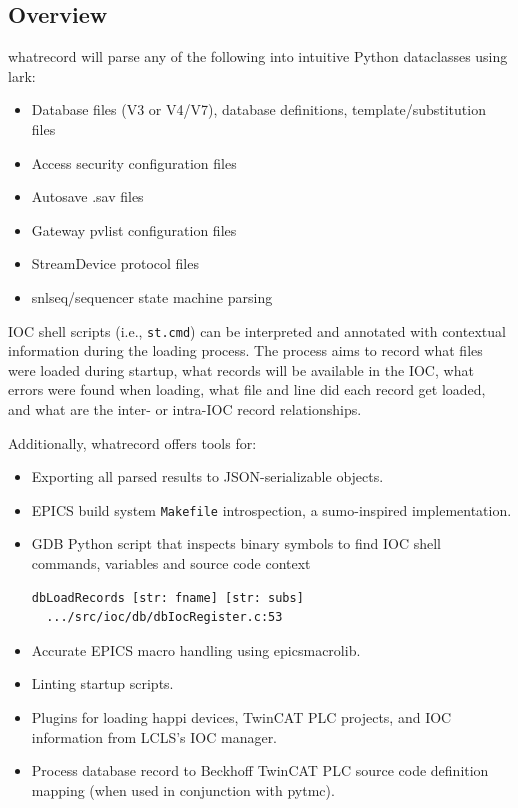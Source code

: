 \documentclass[letter,
               keeplastbox,   %
               ]{jacow}
\begin{document}
\subsection{Overview}
whatrecord will parse any of the following into intuitive Python dataclasses
using lark:
\begin{itemize}
  \item Database files (V3 or V4/V7), database definitions,
    template/substitution files
  \item Access security configuration files
  \item Autosave .sav files
  \item Gateway pvlist configuration files
  \item StreamDevice protocol files
  \item snlseq/sequencer state machine parsing
\end{itemize}

IOC shell scripts (i.e., \verb_st.cmd_) can be interpreted and annotated with
contextual information during the loading process.  The process aims to record
what files were loaded during startup, what records will be available in the
IOC, what errors were found when loading, what file and line did each record
get loaded, and what are the inter- or intra-IOC record relationships.

Additionally, whatrecord offers tools for:
\begin{itemize}
  \item Exporting all parsed results to JSON-serializable objects.
  \item EPICS build system \verb_Makefile_ introspection, a sumo\cite{sumo}-inspired
    implementation.
  \item GDB Python script that inspects binary symbols to find IOC shell
    commands, variables and source code context
    \begin{lstlisting}[language=bash]
  dbLoadRecords [str: fname] [str: subs]
  .../src/ioc/db/dbIocRegister.c:53
    \end{lstlisting}
  \item Accurate EPICS macro handling using epicsmacrolib\cite{epicsmacrolib}.
  \item Linting startup scripts.
  \item Plugins for loading happi devices, TwinCAT PLC projects, and IOC
    information from LCLS’s IOC manager.
  \item Process database record to Beckhoff TwinCAT PLC source code definition
    mapping (when used in conjunction with pytmc\cite{pytmc}).
\end{itemize}
\end{document}
